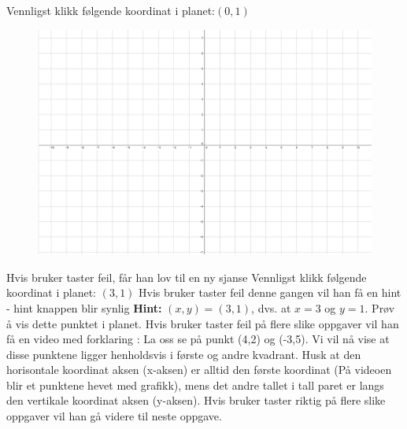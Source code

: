 \documentclass[12pt,twoside,onecolumn]{article}
\begin{document}
\begin{Exercise}
Vennligst klikk følgende koordinat i planet:$(0,1)$
\begin{figure}[h!]
\includegraphics[scale = 0.3]{figures/Grid.png}
\label{fig:grid}
\end{figure}
\newline
{\color{Maroon}Hvis bruker taster feil, får han lov til en ny sjanse}
\newline
Vennligst klikk følgende koordinat i planet: $(3,1)$
\newline
{\color{Maroon}Hvis bruker taster feil denne gangen vil han få en hint - hint knappen blir synlig}
\newline\newline
\textbf{Hint:}  $(x,y) = (3,1)$, dvs. at $x = 3$ og $y = 1$. Prøv å vis dette punktet i planet.
\newline
\newline
{\color{Maroon}Hvis bruker taster feil på flere slike oppgaver vil han få en video med forklaring :} 
\newline
La oss se på punkt (4,2) og (-3,5). Vi vil nå vise at disse punktene ligger henholdsvis i første og andre kvadrant.
Husk at den horisontale koordinat aksen (x-aksen) er alltid den første koordinat ({\color{PineGreen}På videoen blir et punktene hevet med grafikk}), mens det andre tallet i tall paret er langs den vertikale koordinat aksen (y-aksen).
\newline
\newline
{\color{Maroon}Hvis bruker taster riktig på flere slike oppgaver vil han gå videre til neste oppgave.}
\end{Exercise}
\end{document}
